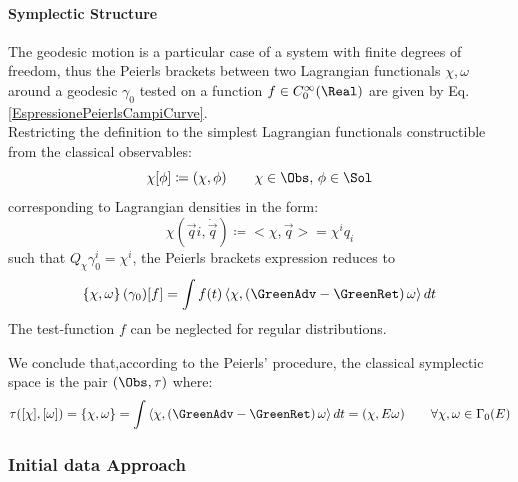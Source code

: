 \documentclass[Main]{subfiles}
\begin{document}
			\paragraph{Symplectic Structure}
				The geodesic motion is a particular case of a system with finite degrees of freedom, thus the Peierls brackets between two Lagrangian functionals $\chi, \omega$ around a geodesic $\gamma_0$ tested on a function $f \in C_0^\infty(\Real)$ are given by Eq.  \ref{EspressionePeierlsCampiCurve}.\\
				Restricting the definition to the simplest Lagrangian functionals constructible from the classical observables:
				\begin{displaymath}
					\chi [\phi] \coloneqq (\chi, \phi) \qquad \chi \in \Obs,\, \phi \in \Sol
				\end{displaymath}
				corresponding to Lagrangian densities in the form:
				\begin{displaymath}
					\chi ( \vec{q}i, \dot{\vec{q}}) \coloneqq < \chi, \vec{q}> = \chi^i q_i
				\end{displaymath}
				such that $ Q_\chi \gamma_0^i = \chi^i$, the Peierls brackets expression reduces to
				\begin{displaymath}
					\left\lbrace\chi , \omega \right\rbrace (\gamma_0) [f] = \int f(t) \left\langle\chi, \left(\GreenAdv - \GreenRet \right)\omega \right\rangle dt
				\end{displaymath}
				The test-function $f$ can be neglected for regular distributions.

				\vspace{3.5mm}
				We conclude that,according to the Peierls' procedure,  the classical symplectic space is the pair $(\Obs, \tau)$ where:
				\begin{displaymath}
					\tau( [\chi], [\omega]) = \{\chi , \omega \} =\int \left\langle\chi, \left(\GreenAdv - \GreenRet \right)\omega \right\rangle dt = ( \chi, E \omega) \qquad \forall \chi,\omega \in \Gamma_0(E)
				\end{displaymath}
				
				
		\subsubsection{Initial data Approach}
\end{document}
